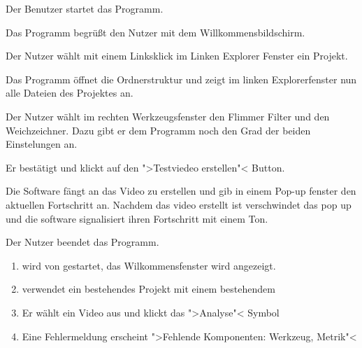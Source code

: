   \begin{compactenum}[1]
\item Der Benutzer startet das Programm.
\item Das Programm begrüßt den Nutzer mit dem Willkommensbildschirm.
\item Der Nutzer wählt mit einem Linksklick im Linken Explorer Fenster ein Projekt.
\item Das Programm öffnet die Ordnerstruktur und zeigt im linken Explorerfenster nun alle Dateien des Projektes an.
\item Der Nutzer wählt im rechten Werkzeugsfenster den Flimmer Filter und den Weichzeichner. Dazu gibt er dem Programm noch den Grad der beiden Einstelungen an.
\item Er bestätigt und klickt auf den ">Testviedeo erstellen"< Button.
\item Die Software fängt an das Video zu erstellen und gib in einem Pop-up fenster den aktuellen Fortschritt an. Nachdem das video erstellt ist verschwindet das pop up und die software signalisiert ihren Fortschritt mit einem Ton.
\item Der Nutzer beendet das Programm.
\end{compactenum}

\begin{enumerate}
\item \projektTitel wird von \dAU gestartet, das Wilkommensfenster wird angezeigt.
\item \dAU verwendet ein bestehendes Projekt mit einem bestehendem 
\item Er wählt ein Video aus und klickt das ">Analyse"< Symbol
\item Eine Fehlermeldung erscheint ">Fehlende Komponenten: Werkzeug, Metrik"<
\end{enumerate}
